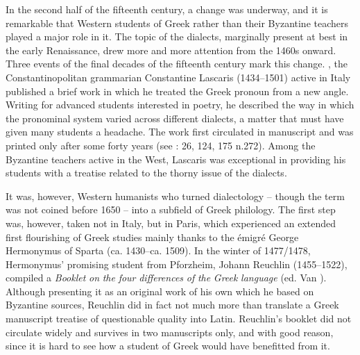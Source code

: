 \documentclass[output=paper]{langsci/langscibook}
\begin{document}
In the second half of the fifteenth century, a change was underway, and it is remarkable that Western students of Greek rather than their Byzantine teachers played a major role in it. The topic of the dialects, marginally present at best in the early Renaissance, drew more and more attention from the 1460s onward. Three events of the final decades of the fifteenth century mark this change. \citealt{In1460}, the Constantinopolitan grammarian Constantine Lascaris (1434–1501) active in Italy published a brief work in which he treated the Greek pronoun from a new angle. Writing for advanced students interested in poetry, he described the way in which the pronominal system varied across different dialects, a matter that must have given many students a headache. The work first circulated in manuscript and was printed only after some forty years (see \citealt{Botley2010}: 26, 124, 175 n.272). Among the Byzantine teachers active in the West, Lascaris was exceptional in providing his students with a treatise related to the thorny issue of the dialects.

It was, however, Western humanists who turned dialectology – though the term was not coined before 1650 – into a subfield of Greek philology. The first step was, however, taken not in Italy, but in Paris, which experienced an extended first flourishing of Greek studies mainly thanks to the émigré George Hermonymus of Sparta (ca. 1430–ca. 1509). In the winter of 1477/1478, Hermonymus’ promising student from Pforzheim, Johann Reuchlin (1455–1522), compiled a \textit{Booklet} \textit{on} \textit{the} \textit{four} \textit{differences} \textit{of} \textit{the} \textit{Greek} \textit{language} (ed. Van \citealt{Rooy2014}). Although presenting it as an original work of his own which he based on Byzantine sources, Reuchlin did in fact not much more than translate a Greek manuscript treatise of questionable quality into Latin. Reuchlin’s booklet did not circulate widely and survives in two manuscripts only, and with good reason, since it is hard to see how a student of Greek would have benefitted from it.
\end{document}
